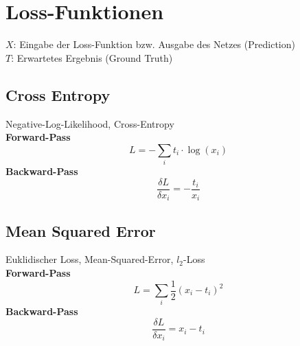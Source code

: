 \documentclass[12pt]{article}
\begin{document}
	\section{Loss-Funktionen}
	$X$: Eingabe der Loss-Funktion bzw. Ausgabe des Netzes (Prediction)\\
	$T$: Erwartetes Ergebnis (Ground Truth)
	\subsection{Cross Entropy}
	Negative-Log-Likelihood, Cross-Entropy\\
	\textbf{Forward-Pass} $$L = -\sum_i t_i \cdot \log(x_i)$$
	\textbf{Backward-Pass} $$\frac{\delta L}{\delta x_i} = -\frac{t_i}{x_i}$$
	\subsection{Mean Squared Error}
	Euklidischer Loss, Mean-Squared-Error, $l_2$-Loss\\
	\textbf{Forward-Pass} $$L = \sum_i \frac{1}{2} (x_i - t_i)^2$$
	\textbf{Backward-Pass} $$\frac{\delta L}{\delta x_i} = x_i - t_i$$
\end{document}
